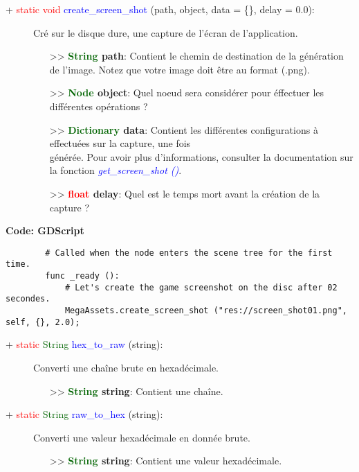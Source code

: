 \documentclass[a4paper, 11pt]{article}
\begin{document}
	\begin{description}
		\item [+ \textcolor{red}{static void} \textcolor{blue}{create\_screen\_shot} (path, object, data =
		\{\}, delay = 0.0):] Cré sur le disque dure, une capture de l'écran de l'application.
		\begin{itemize}
			\item [>> \textbf{\textcolor{darkgreen}{String} path}:] Contient le chemin de destination de la 
			génération de l'image. Notez que votre image doit être au format (.png).
			\item [>> \textbf{\textcolor{darkgreen}{Node} object}:] Quel noeud sera considérer pour 
			éffectuer les différentes opérations ?
			\item [>> \textbf{\textcolor{darkgreen}{Dictionary} data}:] Contient les différentes
			configurations à effectuées sur la capture, une fois \\générée. Pour avoir plus d'informations,
			consulter la documentation sur la fonction \textit{\textcolor{blue}{get\_screen\_shot ()}}.
			\item [>> \textbf{\textcolor{red}{float} delay}:] Quel est le temps mort avant la création de la 
			capture ?\\
		\end{itemize}
	\end{description}
	\textbf{Code: GDScript}
	\begin{lstlisting}
		# Called when the node enters the scene tree for the first time.
		func _ready ():
			# Let's create the game screenshot on the disc after 02 secondes.
			MegaAssets.create_screen_shot ("res://screen_shot01.png", self, {}, 2.0);
	\end{lstlisting}
	\begin{description}
		\item [+ \textcolor{red}{static} \textcolor{darkgreen}{String} \textcolor{blue}{hex\_to\_raw} 
		(string):] Converti une chaîne brute en hexadécimale.
		\begin{itemize}
			\item [>> \textbf{\textcolor{darkgreen}{String} string}:] Contient une chaîne.\\
		\end{itemize}
	\end{description}
	\begin{description}
		\item [+ \textcolor{red}{static} \textcolor{darkgreen}{String} \textcolor{blue}{raw\_to\_hex} 
		(string):] Converti une valeur hexadécimale en donnée brute.
		\begin{itemize}
			\item [>> \textbf{\textcolor{darkgreen}{String} string}:] Contient une valeur hexadécimale.\\
		\end{itemize}
	\end{description}
\end{document}
